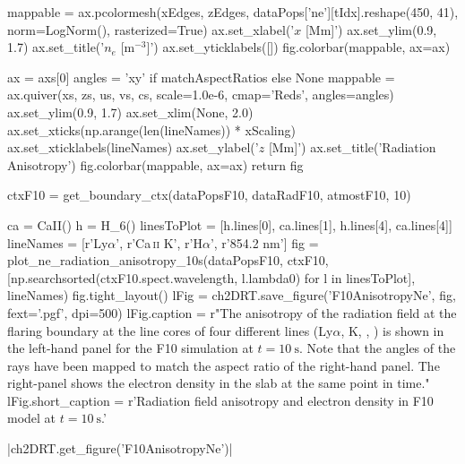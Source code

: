 \begin{pycode}[2DRT]
    mappable = ax.pcolormesh(xEdges, zEdges,
                             dataPops['ne'][tIdx].reshape(450, 41), norm=LogNorm(),
                             rasterized=True)
    ax.set_xlabel('$x$ [Mm]')
    ax.set_ylim(0.9, 1.7)
    ax.set_title('$n_e$ [m$^{-3}$]')
    ax.set_yticklabels([])
    fig.colorbar(mappable, ax=ax)


    ax = axs[0]
    angles = 'xy' if matchAspectRatios else None
    mappable = ax.quiver(xs, zs, us, vs, cs, scale=1.0e-6, cmap='Reds', angles=angles)
    ax.set_ylim(0.9, 1.7)
    ax.set_xlim(None, 2.0)
    ax.set_xticks(np.arange(len(lineNames)) * xScaling)
    ax.set_xticklabels(lineNames)
    ax.set_ylabel('$z$ [Mm]')
    ax.set_title('Radiation Anisotropy')
    fig.colorbar(mappable, ax=ax)
    return fig

ctxF10 = get_boundary_ctx(dataPopsF10, dataRadF10, atmostF10, 10)

ca = CaII()
h = H_6()
linesToPlot = [h.lines[0], ca.lines[1], h.lines[4], ca.lines[4]]
lineNames = [r'Ly$\alpha$', r'Ca\,\textsc{ii} K', r'H$\alpha$', r'854.2 nm']
fig = plot_ne_radiation_anisotropy_10s(dataPopsF10, ctxF10,
                                       [np.searchsorted(ctxF10.spect.wavelength, l.lambda0)
                                        for l in linesToPlot],
                                       lineNames)
fig.tight_layout()
lFig = ch2DRT.save_figure('F10AnisotropyNe', fig, fext='.pgf', dpi=500)
lFig.caption = r"The anisotropy of the radiation field at the flaring boundary at the line cores of four different lines (Ly$\alpha$, \Caii{} K, \Ha{}, \CaLine{}) is shown in the left-hand panel for the F10 simulation at $t=\SI{10}{\second}$. Note that the angles of the rays have been mapped to match the aspect ratio of the right-hand panel. The right-panel shows the electron density in the slab at the same point in time."
lFig.short_caption = r'Radiation field anisotropy and electron density in F10 model at $t=\SI{10}{\second}$.'
\end{pycode}
\py[2DRT]|ch2DRT.get_figure('F10AnisotropyNe')|

